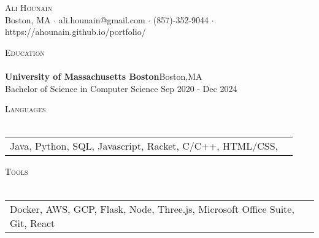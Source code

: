 \documentclass[a4paper]{article}
\newcommand{\lineunder} {
    \vspace*{-8pt} \\
    \hspace*{-18pt} \hrulefill \\
}
\newcommand{\header} [1] {
    {\hspace*{-18pt}\vspace*{6pt} \textsc{#1}}
    \vspace*{-6pt} \lineunder
}
\begin{document}
\vspace*{-40pt}

    

\vspace*{-10pt}
\begin{center}
	{\Huge \scshape {Ali Hounain}}\\
	Boston, MA $\cdot$ ali.hounain@gmail.com $\cdot$ (857)-352-9044 $\cdot$ https://ahounain.github.io/portfolio/\\
\end{center}

\header{Education}
\textbf{University of Massachusetts Boston}\hfill Boston,MA\\
Bachelor of Science in Computer Science \hfill Sep 2020 - Dec 2024\\
\vspace{2mm}



\header{Languages}
\begin{tabular}{ l l }
	Java, Python, SQL, Javascript, Racket, C/C++,  HTML/CSS,   &   \\
\end{tabular}
\vspace{2mm}

\header{Tools}
\begin{tabular}{ l l }
	Docker, AWS, GCP, Flask, Node, Three.js, Microsoft Office Suite, Git, React   &   \\
\end{tabular}
\vspace{2mm}
\end{document}
